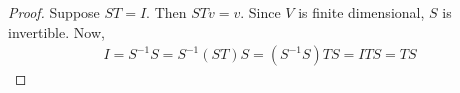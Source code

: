 \documentclass[12pt]{book}
\begin{document}
\begin{proof}
  Suppose $ST = I$. Then $STv = v$. Since $V$ is finite dimensional, $S$ is invertible. Now,
  \begin{align*}
    I = S^{-1}S = S^{-1}(ST)S = (S^{-1}S)TS = ITS = TS
  \end{align*}
\end{proof}

\end{document}
